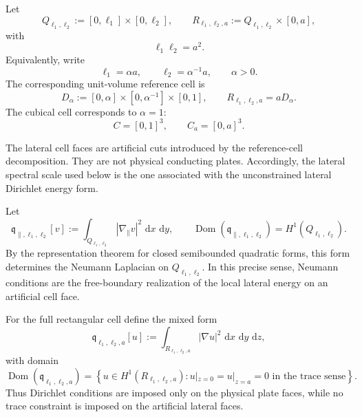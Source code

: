\documentclass[11pt]{article}
\newcommand{\Dom}{\operatorname{Dom}}
\newcommand{\dd}{\,\mathrm{d}}
\begin{document}
Let
\begin{equation}
    Q_{\ell_1,\ell_2}:=[0,\ell_1]\times[0,\ell_2],
    \qquad
    R_{\ell_1,\ell_2,a}:=Q_{\ell_1,\ell_2}\times[0,a],
    \label{eq:reference-rectangular-cell}
\end{equation}
with
\begin{equation}
    \ell_1\ell_2=a^2.
    \label{eq:reference-area-constraint}
\end{equation}
Equivalently, write
\begin{equation}
    \ell_1=\alpha a,
    \qquad
    \ell_2=\alpha^{-1}a,
    \qquad
    \alpha>0.
    \label{eq:reference-aspect-parametrization}
\end{equation}
The corresponding unit-volume reference cell is
\begin{equation}
    D_\alpha
    :=
    [0,\alpha]\times[0,\alpha^{-1}]\times[0,1],
    \qquad
    R_{\ell_1,\ell_2,a}=aD_\alpha.
    \label{eq:unit-reference-aspect-cell}
\end{equation}
The cubical cell corresponds to \(\alpha=1\):
\[
    C=[0,1]^3,
    \qquad
    C_a=[0,a]^3.
\]

The lateral cell faces are artificial cuts introduced by the reference-cell
decomposition.  They are not physical conducting plates.  Accordingly, the
lateral spectral scale used below is the one associated with the
unconstrained lateral Dirichlet energy form.

Let
\[
    \mathfrak q_{\parallel,\ell_1,\ell_2}[v]
    :=
    \int_{Q_{\ell_1,\ell_2}}|\nabla_\parallel v|^2\,\dd x\,\dd y,
    \qquad
    \Dom(\mathfrak q_{\parallel,\ell_1,\ell_2})
    =
    H^1(Q_{\ell_1,\ell_2}).
\]
By the representation theorem for closed semibounded quadratic forms, this
form determines the Neumann Laplacian on \(Q_{\ell_1,\ell_2}\).  In this
precise sense, Neumann conditions are the free-boundary realization of the
local lateral energy on an artificial cell face.

For the full rectangular cell define the mixed form
\begin{equation}
    \mathfrak q_{\ell_1,\ell_2,a}[u]
    :=
    \int_{R_{\ell_1,\ell_2,a}}|\nabla u|^2\,\dd x\,\dd y\,\dd z,
    \label{eq:mixed-cell-form}
\end{equation}
with domain
\begin{equation}
    \Dom(\mathfrak q_{\ell_1,\ell_2,a})
    =
    \left\{
        u\in H^1(R_{\ell_1,\ell_2,a}):
        u|_{z=0}=u|_{z=a}=0
        \text{ in the trace sense}
    \right\}.
    \label{eq:mixed-cell-form-domain}
\end{equation}
Thus Dirichlet conditions are imposed only on the physical plate faces, while
no trace constraint is imposed on the artificial lateral faces.
\end{document}
